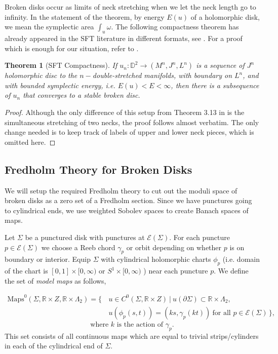 \documentclass[11pt, oneside,dvipsnames]{amsart}
\renewcommand{\to}{\rightarrow}
\newcommand{\D}{\mathbb{D}}
\newcommand{\Maps}{\text{Maps}}
\renewcommand{\to}{\rightarrow}
\newcommand{\<}{\langle}
\renewcommand{\>}{\rangle}
\newcommand{\cE}{\mathcal{E}}
\renewcommand{\to}{\rightarrow}
\newtheorem{Theorem}{Theorem}[section]
\theoremstyle{definition}
\theoremstyle{definition}
\numberwithin{equation}{subsection}
\begin{document}
Broken disks occur as limits of neck stretching when we let the neck length go to infinity. In the statement of the theorem, by energy $E(u)$ of a holomorphic disk, we mean the symplectic area $\int_u \omega$.  The following compactness theorem has already appeared in the SFT literature in different formats, see \cite{BEH03,Abbasbook,CM05,floflip,cant2022dimension}. For a proof which is enough for our situation, refer to \cite
[\S 3]{Cha23}.
\begin{Theorem}[SFT Compactness]
If $u_n : \D^2 \to (M
^n,J^n,L^n) $ is a sequence of $J^n$ holomorphic disc to the $n-$double-stretched manifolds, with boundary on $L^n$, and with bounded symplectic energy, i.e. $E(u) < E< \infty$, then there is a subsequence of $u_n$ that converges to a stable broken disc.
\end{Theorem}
\begin{proof}
    Although the only difference of this setup from Theorem 3.13 in \cite{Cha23} is the simultaneous stretching of two necks, the proof follows almost verbatim. The only change needed is to keep track of labels of upper and lower neck pieces, which is omitted here. 
    \end{proof}
\subsection{Fredholm Theory for Broken Disks}\label{sec:Freddy}

  
We will setup the required Fredholm theory to cut out the moduli space of broken disks as a zero set of a Fredholm section. Since we have punctures going to cylindrical ends, we use weighted Sobolev spaces to create Banach spaces of maps.

Let $\Sigma$ be a punctured disk with punctures at $\cE(\Sigma)$. For each puncture $p\in \cE(\Sigma)$ we choose a Reeb chord $\gamma_p$ or orbit depending on whether $p$ is on boundary or interior. Equip $\Sigma$ with cylindrical  holomorphic charts $\phi_p$ (i.e. domain of the chart is $[0,1]\times [0,\infty)$ or $S^1\times[0,\infty)$ ) near each puncture $p$. We define the set of \textit{model maps} as
follows,

\[
\begin{aligned}
\Maps^0(\Sigma, \mathbb{R} \times Z, \mathbb{R} \times \Lambda_2)
= \Big\{ \,
& u \in C^0(\Sigma, \mathbb{R} \times Z)
\ \Big|\ 
u(\partial \Sigma) \subset \mathbb{R} \times \Lambda_2, \\
& u(\phi_p(s,t)) = (k s, \gamma_p(k t))
\ \text{for all } p \in \mathcal{E}(\Sigma)
\, \Big\},
\end{aligned}
\]
\[
\text{where } k \text{ is the action of } \gamma_p.
\]
This set consists of all continuous maps which are equal to trivial strips/cylinders in each of the cylindrical end of $\Sigma$.
\end{document}
